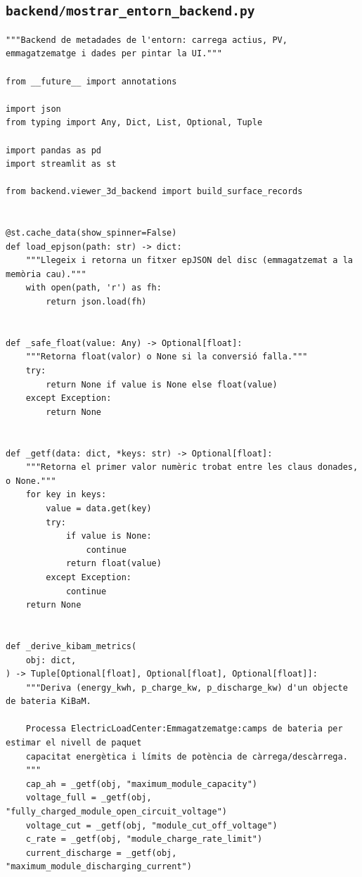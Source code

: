 \documentclass[10pt,a4paper]{article}
\begin{document}

\subsection{\texorpdfstring{\texttt{backend/mostrar\_entorn\_backend.py}}{backend/mostrar\_entorn\_backend.py}}

\begin{lstlisting}[style=studioPython,caption={backend/mostrar\_entorn\_backend.py},label={lst:backend-mostrar-entorn-backend-py}]
"""Backend de metadades de l'entorn: carrega actius, PV, emmagatzematge i dades per pintar la UI."""

from __future__ import annotations

import json
from typing import Any, Dict, List, Optional, Tuple

import pandas as pd
import streamlit as st

from backend.viewer_3d_backend import build_surface_records


@st.cache_data(show_spinner=False)
def load_epjson(path: str) -> dict:
    """Llegeix i retorna un fitxer epJSON del disc (emmagatzemat a la memòria cau)."""
    with open(path, 'r') as fh:
        return json.load(fh)


def _safe_float(value: Any) -> Optional[float]:
    """Retorna float(valor) o None si la conversió falla."""
    try:
        return None if value is None else float(value)
    except Exception:
        return None


def _getf(data: dict, *keys: str) -> Optional[float]:
    """Retorna el primer valor numèric trobat entre les claus donades, o None."""
    for key in keys:
        value = data.get(key)
        try:
            if value is None:
                continue
            return float(value)
        except Exception:
            continue
    return None


def _derive_kibam_metrics(
    obj: dict,
) -> Tuple[Optional[float], Optional[float], Optional[float]]:
    """Deriva (energy_kwh, p_charge_kw, p_discharge_kw) d'un objecte de bateria KiBaM.

    Processa ElectricLoadCenter:Emmagatzematge:camps de bateria per estimar el nivell de paquet
    capacitat energètica i límits de potència de càrrega/descàrrega.
    """
    cap_ah = _getf(obj, "maximum_module_capacity")
    voltage_full = _getf(obj, "fully_charged_module_open_circuit_voltage")
    voltage_cut = _getf(obj, "module_cut_off_voltage")
    c_rate = _getf(obj, "module_charge_rate_limit")
    current_discharge = _getf(obj, "maximum_module_discharging_current")


\end{lstlisting}
\end{document}
